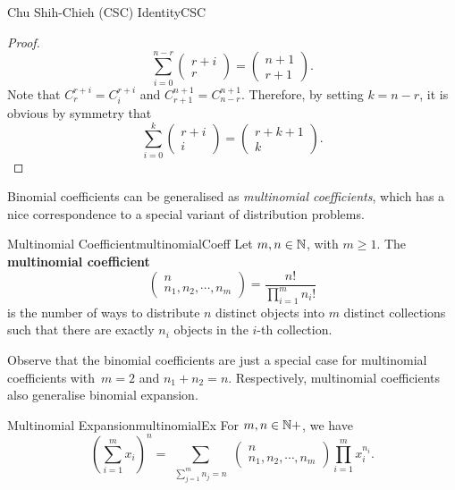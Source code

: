 \documentclass[math]{amznotes}
\theoremstyle{remark}
\begin{document}
\begin{thmbox}{Chu Shih-Chieh (CSC) Identity}{CSC}
\begin{proof}
        \begin{equation*}
            \sum_{i = 0}^{n - r}\begin{pmatrix}
                r + i \\
                r
            \end{pmatrix} = \begin{pmatrix}
                n + 1 \\
                r + 1
            \end{pmatrix}.
        \end{equation*}
        Note that $C^{r + i}_r = C^{r + i}_i$ and $C^{n + 1}_{r + 1} = C^{n + 1}_{n - r}$. Therefore, by setting $k = n - r$, it is obvious by symmetry that
        \begin{equation*}
            \sum_{i = 0}^{k}\begin{pmatrix}
                r + i \\
                i
            \end{pmatrix} = \begin{pmatrix}
                r + k + 1 \\
                k
            \end{pmatrix}.
        \end{equation*}
    \end{proof}
\end{thmbox}
Binomial coefficients can be generalised as \textit{multinomial coefficients}, which has a nice correspondence to a special variant of distribution problems.
\begin{dfnbox}{Multinomial Coefficient}{multinomialCoeff}
    Let $m, n \in \mathbb{N}$, with $m \geq 1$. The {\color{red} \textbf{multinomial coefficient}}
    \begin{displaymath}
        \begin{pmatrix}
            n \\
            n_1, n_2, \cdots, n_m
        \end{pmatrix} = \frac{n!}{\prod_{i = 1}^{m}n_i!}
    \end{displaymath}
    is the number of ways to distribute $n$ distinct objects into $m$ distinct collections such that there are exactly $n_i$ objects in the $i$-th collection.
\end{dfnbox}
Observe that the binomial coefficients are just a special case for multinomial coefficients with~$m = 2$ and $n_1 + n_2 = n$. Respectively, multinomial coefficients also generalise binomial expansion.
\begin{thmbox}{Multinomial Expansion}{multinomialEx}
    For $m, n \in \mathbb{N}+$, we have
    \begin{equation*}
        \left(\sum_{i = 1}^{m}x_i\right)^n = \sum_{\substack{\sum_{j = 1}^{m}n_j = n}} \begin{pmatrix}
            n \\
            n_1, n_2, \cdots, n_m
        \end{pmatrix}\prod_{i = 1}^{m}x_i^{n_i}.
    \end{equation*}
\end{thmbox}
\end{document}
